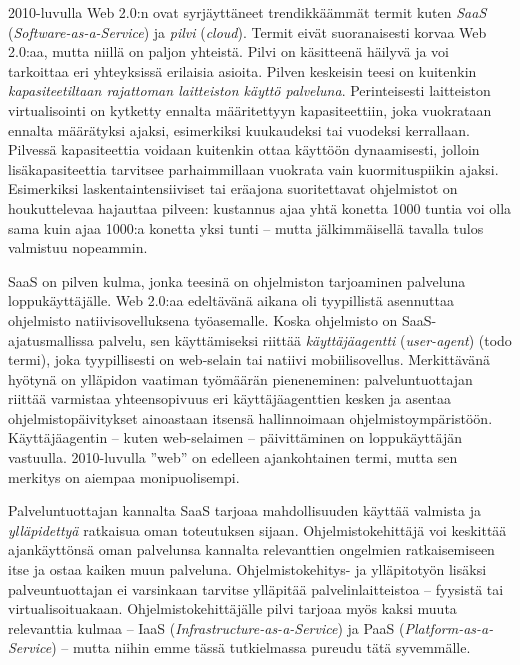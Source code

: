 \documentclass[finnish,gradu]{tktltiki}
\begin{document}
  2010-luvulla Web 2.0:n ovat syrjäyttäneet trendikkäämmät termit kuten \emph{SaaS} (\emph{Software-as-a-Service}) ja \emph{pilvi} (\emph{cloud}). Termit eivät suoranaisesti korvaa Web 2.0:aa, mutta niillä on paljon yhteistä. Pilvi on käsitteenä häilyvä ja voi tarkoittaa eri yhteyksissä erilaisia asioita. Pilven keskeisin teesi on kuitenkin \emph{kapasiteetiltaan rajattoman laitteiston käyttö palveluna}. Perinteisesti laitteiston virtualisointi on kytketty ennalta määritettyyn kapasiteettiin, joka vuokrataan ennalta määrätyksi ajaksi, esimerkiksi kuukaudeksi tai vuodeksi kerrallaan. Pilvessä kapasiteettia voidaan kuitenkin ottaa käyttöön dynaamisesti, jolloin lisäkapasiteettia tarvitsee parhaimmillaan vuokrata vain kuormituspiikin ajaksi. Esimerkiksi laskentaintensiiviset tai eräajona suoritettavat ohjelmistot on houkuttelevaa hajauttaa pilveen: kustannus ajaa yhtä konetta 1000 tuntia voi olla sama kuin ajaa 1000:a konetta yksi tunti -- mutta jälkimmäisellä tavalla tulos valmistuu nopeammin.

  SaaS on pilven kulma, jonka teesinä on ohjelmiston tarjoaminen palveluna loppukäyttäjälle. Web 2.0:aa edeltävänä aikana oli tyypillistä asennuttaa ohjelmisto natiivisovelluksena työasemalle. Koska ohjelmisto on SaaS-ajatusmallissa palvelu, sen käyttämiseksi riittää \emph{käyttäjäagentti} (\emph{user-agent}) (todo termi), joka tyypillisesti on web-selain tai natiivi mobiilisovellus. Merkittävänä hyötynä on ylläpidon vaatiman työmäärän pieneneminen: palveluntuottajan riittää varmistaa yhteensopivuus eri käyttäjäagenttien kesken ja asentaa ohjelmistopäivitykset ainoastaan itsensä hallinnoimaan ohjelmistoympäristöön. Käyttäjäagentin -- kuten web-selaimen -- päivittäminen on loppukäyttäjän vastuulla. 2010-luvulla ''web'' on edelleen ajankohtainen termi, mutta sen merkitys on aiempaa monipuolisempi.


  Palveluntuottajan kannalta SaaS tarjoaa mahdollisuuden käyttää valmista ja \emph{ylläpidettyä} ratkaisua oman toteutuksen sijaan. Ohjelmistokehittäjä voi keskittää ajankäyttönsä oman palvelunsa kannalta relevanttien ongelmien ratkaisemiseen itse ja ostaa kaiken muun palveluna. Ohjelmistokehitys- ja ylläpitotyön lisäksi palveuntuottajan ei varsinkaan tarvitse ylläpitää palvelinlaitteistoa -- fyysistä tai virtualisoituakaan. Ohjelmistokehittäjälle pilvi tarjoaa myös kaksi muuta relevanttia kulmaa -- IaaS (\emph{Infrastructure-as-a-Service}) ja PaaS (\emph{Platform-as-a-Service}) -- mutta niihin emme tässä tutkielmassa pureudu tätä syvemmälle.
\end{document}
